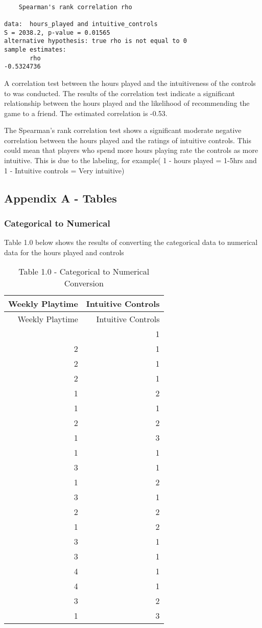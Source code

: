 \documentclass[
  letterpaper,
  DIV=11,
  numbers=noendperiod]{scrartcl}
\begin{document}
\begin{verbatim}

    Spearman's rank correlation rho

data:  hours_played and intuitive_controls
S = 2038.2, p-value = 0.01565
alternative hypothesis: true rho is not equal to 0
sample estimates:
       rho 
-0.5324736 
\end{verbatim}

A correlation test between the hours played and the intuitiveness of the
controls to was conducted. The results of the correlation test indicate
a significant relationship between the hours played and the likelihood
of recommending the game to a friend. The estimated correlation is
-0.53.

The Spearman's rank correlation test shows a significant moderate
negative correlation between the hours played and the ratings of
intuitive controls. This could mean that players who spend more hours
playing rate the controls as more intuitive. This is due to the
labeling, for example( 1 - hours played = 1-5hrs and 1 - Intuitive
controls = Very intuitive)

\subsection{Appendix A - Tables}\label{appendix-a---tables}

\subsubsection{Categorical to Numerical}\label{categorical-to-numerical}

Table 1.0 below shows the results of converting the categorical data to
numerical data for the hours played and controls

\begin{longtable}[]{@{}rr@{}}
\caption{Table 1.0 - Categorical to Numerical Conversion}\tabularnewline
\toprule\noalign{}
Weekly Playtime & Intuitive Controls \\
\midrule\noalign{}
\endfirsthead
\toprule\noalign{}
Weekly Playtime & Intuitive Controls \\
\midrule\noalign{}
\endhead
\bottomrule\noalign{}
\endlastfoot
2 & 1 \\
2 & 1 \\
2 & 1 \\
2 & 1 \\
1 & 2 \\
1 & 1 \\
2 & 2 \\
1 & 3 \\
1 & 1 \\
3 & 1 \\
1 & 2 \\
3 & 1 \\
2 & 2 \\
1 & 2 \\
3 & 1 \\
3 & 1 \\
4 & 1 \\
4 & 1 \\
3 & 2 \\
1 & 3 \\
\end{longtable}
\end{document}
